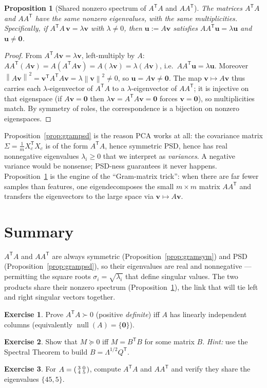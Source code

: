 \documentclass[11pt,oneside]{book}
\theoremstyle{plain}
\newtheorem{proposition}[theorem]{Proposition}
\theoremstyle{definition}
\newtheorem{exercise}{Exercise}[chapter]
\theoremstyle{remark}
\newcommand{\nul}{\operatorname{null}}
\newcommand{\norm}[1]{\left\lVert #1 \right\rVert}
\newcommand{\T}{^{\mathsf T}}
\newcommand{\bu}{\mathbf{u}}
\newcommand{\bv}{\mathbf{v}}
\newcommand{\bzero}{\mathbf{0}}
\begin{document}
\begin{proposition}[Shared nonzero spectrum of $A\T A$ and $AA\T$]\label{prop:sharedspec}
The matrices $A\T A$ and $AA\T$ have the same nonzero eigenvalues, with the same
multiplicities. Specifically, if $A\T A\,\bv=\lambda\bv$ with $\lambda\ne0$, then
$\bu:=A\bv$ satisfies $AA\T\bu=\lambda\bu$ and $\bu\ne\bzero$.
\end{proposition}
\begin{proof}
From $A\T A\bv=\lambda\bv$, left-multiply by $A$:
$AA\T(A\bv)=A(A\T A\bv)=A(\lambda\bv)=\lambda(A\bv)$, i.e.\ $AA\T\bu=\lambda\bu$.
Moreover $\norm{A\bv}^2=\bv\T A\T A\bv=\lambda\norm{\bv}^2\ne0$, so $\bu=A\bv\ne\bzero$.
The map $\bv\mapsto A\bv$ thus carries each $\lambda$-eigenvector of $A\T A$ to a
$\lambda$-eigenvector of $AA\T$; it is injective on that eigenspace (if $A\bv=\bzero$
then $\lambda\bv=A\T A\bv=\bzero$ forces $\bv=\bzero$), so multiplicities match. By
symmetry of roles, the correspondence is a bijection on nonzero eigenspaces.
\end{proof}

\begin{ml_box}
Proposition~\ref{prop:grampsd} is the reason PCA works at all: the covariance matrix
$\Sigma=\tfrac1m X_c\T X_c$ is of the form $A\T A$, hence symmetric PSD, hence has real
nonnegative eigenvalues $\lambda_i\ge0$ that we interpret as \emph{variances}. A negative
variance would be nonsense; PSD-ness guarantees it never happens.
Proposition~\ref{prop:sharedspec} is the engine of the ``Gram-matrix trick'': when there
are far fewer samples than features, one eigendecomposes the small $m\times m$ matrix
$AA\T$ and transfers the eigenvectors to the large space via $\bv\mapsto A\bv$.
\end{ml_box}

\section*{Summary}
$A\T A$ and $AA\T$ are always symmetric (Proposition~\ref{prop:gramsym}) and PSD
(Proposition~\ref{prop:grampsd}), so their eigenvalues are real and nonnegative ---
permitting the square roots $\sigma_i=\sqrt{\lambda_i}$ that define singular values. The
two products share their nonzero spectrum (Proposition~\ref{prop:sharedspec}), the link
that will tie left and right singular vectors together.

\begin{exercise}
Prove $A\T A\succ0$ (positive \emph{definite}) iff $A$ has linearly independent columns
(equivalently $\nul(A)=\{\bzero\}$).
\end{exercise}
\begin{exercise}
Show that $M\succeq0$ iff $M=B\T B$ for some matrix $B$. \emph{Hint:} use the Spectral
Theorem to build $B=\Lambda^{1/2}Q\T$.
\end{exercise}
\begin{exercise}
For $A=\begin{psmallmatrix}3&0\\4&5\end{psmallmatrix}$, compute $A\T A$ and $AA\T$ and
verify they share the eigenvalues $\{45,5\}$.
\end{exercise}
\end{document}

